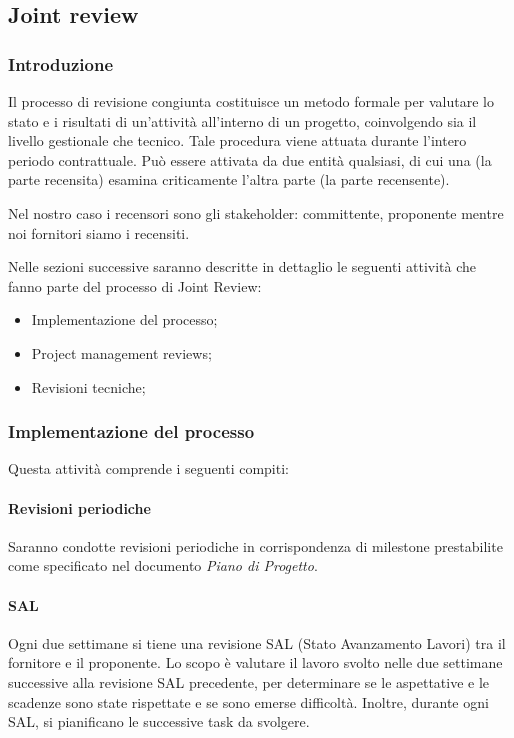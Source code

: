 \subsection{Joint review} 

\subsubsection{Introduzione}
Il processo di revisione congiunta costituisce un metodo formale per valutare lo stato e i risultati di un'attività all'interno di un progetto, coinvolgendo sia il livello gestionale che tecnico. Tale procedura viene attuata durante l'intero periodo contrattuale. Può essere attivata da due entità qualsiasi, di cui una (la parte recensita) esamina criticamente l'altra parte (la parte recensente).

Nel nostro caso i recensori sono gli stakeholder: committente, proponente mentre noi fornitori siamo i recensiti.

Nelle sezioni successive saranno descritte in dettaglio le seguenti attività che fanno parte del processo di Joint Review:
\begin{itemize}
    \item Implementazione del processo;
    \item Project management reviews;
    \item Revisioni tecniche;
\end{itemize}

\subsubsection{Implementazione del processo}
Questa attività comprende i seguenti compiti:

\paragraph{Revisioni periodiche}
Saranno condotte revisioni periodiche in corrispondenza di milestone prestabilite come specificato nel documento \textit{Piano di Progetto}.

\paragraph{SAL}
Ogni due settimane si tiene una revisione SAL (Stato Avanzamento Lavori) tra il fornitore e il proponente. Lo scopo è valutare il lavoro svolto nelle due settimane successive alla revisione SAL precedente, per determinare se le aspettative e le scadenze sono state rispettate e se sono emerse difficoltà. Inoltre, durante ogni SAL, si pianificano le successive task da svolgere.

